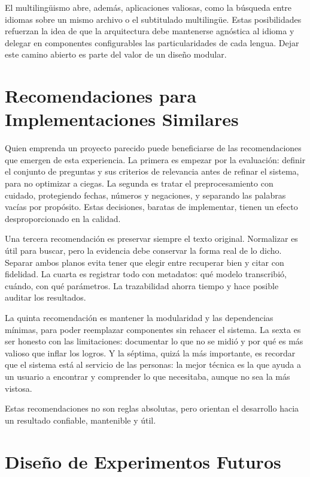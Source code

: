 \documentclass[12pt,a4paper]{article}
\begin{document}
El multilingüismo abre, además, aplicaciones valiosas, como la búsqueda entre idiomas sobre un mismo archivo o el subtitulado multilingüe. Estas posibilidades refuerzan la idea de que la arquitectura debe mantenerse agnóstica al idioma y delegar en componentes configurables las particularidades de cada lengua. Dejar este camino abierto es parte del valor de un diseño modular.



\section{Recomendaciones para Implementaciones Similares}
\label{sec:recomendaciones}

Quien emprenda un proyecto parecido puede beneficiarse de las recomendaciones que emergen de esta experiencia. La primera es empezar por la evaluación: definir el conjunto de preguntas y sus criterios de relevancia antes de refinar el sistema, para no optimizar a ciegas. La segunda es tratar el preprocesamiento con cuidado, protegiendo fechas, números y negaciones, y separando las palabras vacías por propósito. Estas decisiones, baratas de implementar, tienen un efecto desproporcionado en la calidad.

Una tercera recomendación es preservar siempre el texto original. Normalizar es útil para buscar, pero la evidencia debe conservar la forma real de lo dicho. Separar ambos planos evita tener que elegir entre recuperar bien y citar con fidelidad. La cuarta es registrar todo con metadatos: qué modelo transcribió, cuándo, con qué parámetros. La trazabilidad ahorra tiempo y hace posible auditar los resultados.

La quinta recomendación es mantener la modularidad y las dependencias mínimas, para poder reemplazar componentes sin rehacer el sistema. La sexta es ser honesto con las limitaciones: documentar lo que no se midió y por qué es más valioso que inflar los logros. Y la séptima, quizá la más importante, es recordar que el sistema está al servicio de las personas: la mejor técnica es la que ayuda a un usuario a encontrar y comprender lo que necesitaba, aunque no sea la más vistosa.

Estas recomendaciones no son reglas absolutas, pero orientan el desarrollo hacia un resultado confiable, mantenible y útil.



\section{Diseño de Experimentos Futuros}
\label{sec:experimentos}
\end{document}
